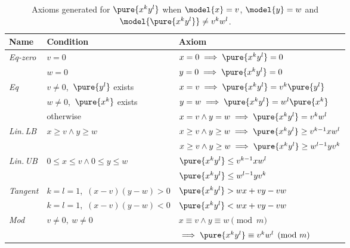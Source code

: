 \begin{table}[ht]
	\centering
	\label{tab:mul-axioms}
	\setlength{\tabcolsep}{1.2em}
	\renewcommand{\arraystretch}{1.3}
	\begin{tabular}{@{}lll@{}}
		\hline
		\textbf{Name}     & \textbf{Condition}                      & \textbf{Axiom}                                                                    \\
		\hline
		\textit{Eq-zero}  & $v = 0$                                 & $x = 0 \implies \pure{x^k y^l} = 0$                                              \\
		                  & $w = 0$                                 & $y = 0 \implies \pure{x^k y^l} = 0$                                              \\
		\hline
		\textit{Eq}       & $v \neq 0$,\ $\pure{y^l}$ exists        & $x = v \implies \pure{x^k y^l} = v^k \pure{y^l}$                                 \\
		                  & $w \neq 0$,\ $\pure{x^k}$ exists        & $y = w \implies \pure{x^k y^l} = w^l \pure{x^k}$                                 \\
		                  & otherwise                               & $x = v \land y = w \implies \pure{x^k y^l} = v^k w^l$                            \\
		\hline
		\textit{Lin.\,LB} & $x \geq v \land y \geq w$               & $x \geq v \land y \geq w \implies \pure{x^k y^l} \geq v^{k-1} x w^l$            \\
		                  &                                         & $x \geq v \land y \geq w \implies \pure{x^k y^l} \geq w^{l-1} y v^k$            \\
		\hline
		\textit{Lin.\,UB} & $0 \leq x \leq v \land 0 \leq y \leq w$ & $\pure{x^k y^l} \leq v^{k-1} x w^l$                                             \\
		                  &                                         & $\pure{x^k y^l} \leq w^{l-1} y v^k$                                             \\
		\hline
		\textit{Tangent}  & $k=l=1$,\ $(x-v)(y-w) > 0$              & $\pure{x^k y^l} > wx + vy - vw$                                                  \\
		                  & $k=l=1$,\ $(x-v)(y-w) < 0$              & $\pure{x^k y^l} < wx + vy - vw$                                                  \\
		\hline
		\textit{Mod}      & $v \neq 0,\ w \neq 0$                   & $x \equiv v \land y \equiv w \pmod{m}$                                           \\
		                  &                                         & $\implies \pure{x^k y^l} \equiv v^k w^l \pmod{m}$                                \\
		\hline
	\end{tabular}
	\vspace{0.9em}
	\caption{%
		Axioms generated for $\pure{x^k y^l}$ when $\model{x}=v$, $\model{y}=w$ and $\model{\pure{x^k y^l}}\neq v^kw^l$.}
\end{table}
